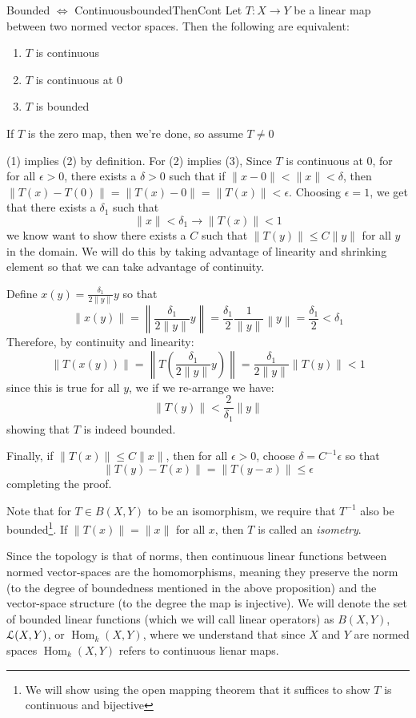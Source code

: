 \documentclass[oneside]{book}
\newcommand{\EL}{\EuScript{L}}
\newcommand{\Hom}{\operatorname{Hom}}
\newcommand{\rw}{\rightarrow}
\newcommand{\LRw}{\Leftrightarrow}
\begin{document}
\begin{prop}{Bounded $\LRw$ Continuous}{boundedThenCont}
	Let $T: X \rw Y$ be a linear map between two normed vector spaces. Then the following are equivalent:
	\begin{enumerate}
		\item $T$ is continuous
		\item $T$ is continuous at $0$
		\item $T$ is bounded
	\end{enumerate}
\end{prop}

\begin{Proof}
	If $T$ is the zero map, then we're done, so assume $T \ne 0$

		(1) implies (2) by definition. For (2) implies (3), Since $T$ is continuous at $0$, for for all
		$\epsilon > 0$, there exists a $\delta > 0$ such that if $\|x-0\| < \|x\| < \delta$, then $\|T(x)
		- T(0)\| = \|T(x)-0\| = \|T(x)\| < \epsilon$. Choosing $\epsilon = 1$, we get that there exists a $\delta_1$ such that
		\[
			\|x\| < \delta_1 \rightarrow \|T(x)\| < 1
		\]
		we know want to show there exists a $C$ such that $\|T(y)\| \le C\|y\|$ for all $y$ in the domain.
		We will do this by taking advantage of linearity and shrinking element so that we can take advantage
		of continuity.

		Define $x(y) = \frac{\delta_1}{2\|y\|}y$ so that
		\[
			\|x(y)\| = \left\| \frac{\delta_1}{2\|y\|}y\right\| = \frac{\delta_1}{2}
			\frac{1}{\|y\|}\left\|y\right\|
			= \frac{\delta_1}{2} < \delta_1
		\]
        Therefore, by continuity and linearity:
		\[
			\|T(x(y))\| = \left\| T \left( \frac{\delta_1}{2\|y\|} y \right)\right\|
			= \frac{\delta_1}{2\|y\|}\|T(y)\| < 1
		\]
		since this is true for all $y$, we if we re-arrange we have:
		\[
			\|T(y)\| < \frac{2}{\delta_1}\|y\|
		\]
		showing that $T$ is indeed bounded.

		Finally, if $\|T(x)\| \le C\|x\|$, then for all $\epsilon > 0$, choose $\delta = C^{-1}\epsilon$ so that
		\[
			\|T(y) - T(x)\| = \|T(y-x)\| \le \epsilon
		\]
		completing the proof.
\end{Proof}

Note that for $T \in B(X,Y)$ to be an isomorphism, we require that $T^{-1}$ also be bounded\footnote{We will show using
the open mapping theorem that it suffices to show $T$ is continuous and bijective}. If $\|T(x)\| = \|x\|$ for all $x$,
then $T$ is called an \emph{isometry}.

Since the topology is that of norms, then continuous linear functions between normed vector-spaces are the
homomorphisms, meaning they preserve the norm (to the degree of boundedness mentioned in the above proposition) and the
vector-space structure (to the degree the map is injective). We will denote the set of bounded linear functions (which
we will call linear operators) as $B(X,Y)$, $\EL(X,Y)$, or $\Hom_k(X,Y)$, where we understand that since $X$ and
$Y$ are normed spaces $\Hom_k(X,Y)$ refers to continuous lienar maps.
\end{document}
